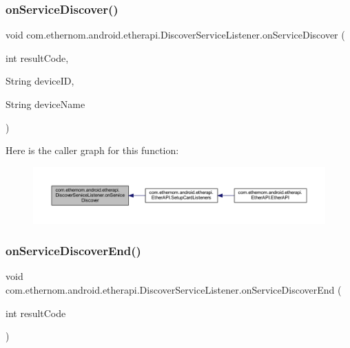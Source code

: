 \subsubsection{\texorpdfstring{on\+Service\+Discover()}{onServiceDiscover()}}
{\footnotesize\ttfamily void com.\+ethernom.\+android.\+etherapi.\+Discover\+Service\+Listener.\+on\+Service\+Discover (\begin{DoxyParamCaption}\item[{int}]{result\+Code,  }\item[{String}]{device\+ID,  }\item[{String}]{device\+Name }\end{DoxyParamCaption})}

Here is the caller graph for this function\+:\nopagebreak
\begin{figure}[H]
\begin{center}
\leavevmode
\includegraphics[width=350pt]{interfacecom_1_1ethernom_1_1android_1_1etherapi_1_1_discover_service_listener_af4153d6e21ddccb41644a042c448e400_icgraph}
\end{center}
\end{figure}
\mbox{\label{interfacecom_1_1ethernom_1_1android_1_1etherapi_1_1_discover_service_listener_af4a5c1f5c82cde22d8ec1effe5a51ff9}} 
\subsubsection{\texorpdfstring{on\+Service\+Discover\+End()}{onServiceDiscoverEnd()}}
{\footnotesize\ttfamily void com.\+ethernom.\+android.\+etherapi.\+Discover\+Service\+Listener.\+on\+Service\+Discover\+End (\begin{DoxyParamCaption}\item[{int}]{result\+Code }\end{DoxyParamCaption})}


